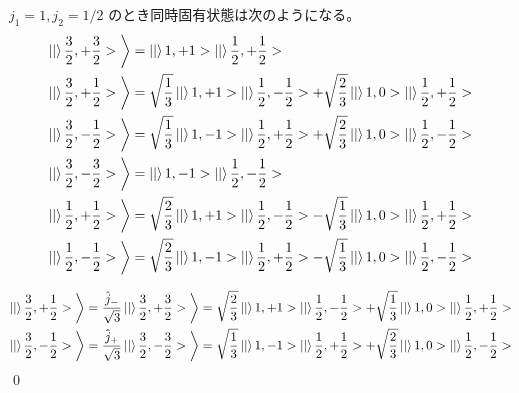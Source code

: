 \documentclass[uplatex,dvipdfmx,a4paper,11pt]{jlreq}
\makeatletter
\numberwithin{equation}{section}
\theoremstyle{definition}
\renewenvironment{proof}[1][\proofname]{\par
  \normalfont
  \topsep6\p@\@plus6\p@ \trivlist
  \item[\hskip\labelsep{\bfseries #1}\@addpunct{\bfseries}]\ignorespaces\quad\par
}{%
  \qed\endtrivlist\@endpefalse
}
\renewcommand\proofname{証明}
\makeatother
\begin{document}
\begin{proposition}
  $j_1 = 1, j_2 = 1/2$ のとき同時固有状態は次のようになる。
  \begin{align}
    \ket|\frac{3}{2}, +\frac{3}{2}>\bigg\rangle & = \ket|1, +1>\ket|\frac{1}{2}, +\frac{1}{2}>                                                                                 \\
    \ket|\frac{3}{2}, +\frac{1}{2}>\bigg\rangle & = \sqrt{\frac{1}{3}}\ket|1, +1>\ket|\frac{1}{2}, -\frac{1}{2}> + \sqrt{\frac{2}{3}}\ket|1, 0>\ket|\frac{1}{2}, +\frac{1}{2}> \\
    \ket|\frac{3}{2}, -\frac{1}{2}>\bigg\rangle & = \sqrt{\frac{1}{3}}\ket|1, -1>\ket|\frac{1}{2}, +\frac{1}{2}> + \sqrt{\frac{2}{3}}\ket|1, 0>\ket|\frac{1}{2}, -\frac{1}{2}> \\
    \ket|\frac{3}{2}, -\frac{3}{2}>\bigg\rangle & = \ket|1, -1>\ket|\frac{1}{2}, -\frac{1}{2}>                                                                                 \\
    \ket|\frac{1}{2}, +\frac{1}{2}>\bigg\rangle & = \sqrt{\frac{2}{3}}\ket|1, +1>\ket|\frac{1}{2}, -\frac{1}{2}> - \sqrt{\frac{1}{3}}\ket|1, 0>\ket|\frac{1}{2}, +\frac{1}{2}> \\
    \ket|\frac{1}{2}, -\frac{1}{2}>\bigg\rangle & = \sqrt{\frac{2}{3}}\ket|1, -1>\ket|\frac{1}{2}, +\frac{1}{2}> - \sqrt{\frac{1}{3}}\ket|1, 0>\ket|\frac{1}{2}, -\frac{1}{2}>
  \end{align}
\end{proposition}
\begin{proof}
  \begin{align}
    \ket|\frac{3}{2}, +\frac{1}{2}>\bigg\rangle & = \frac{\hat{j}_-}{\sqrt{3}}\ket|\frac{3}{2}, +\frac{3}{2}>\bigg\rangle = \sqrt{\frac{2}{3}}\ket|1, +1>\ket|\frac{1}{2}, -\frac{1}{2}> + \sqrt{\frac{1}{3}}\ket|1, 0>\ket|\frac{1}{2}, +\frac{1}{2}> \\
    \ket|\frac{3}{2}, -\frac{1}{2}>\bigg\rangle & = \frac{\hat{j}_+}{\sqrt{3}}\ket|\frac{3}{2}, -\frac{3}{2}>\bigg\rangle = \sqrt{\frac{1}{3}}\ket|1, -1>\ket|\frac{1}{2}, +\frac{1}{2}> + \sqrt{\frac{2}{3}}\ket|1, 0>\ket|\frac{1}{2}, -\frac{1}{2}>
  \end{align}
\end{proof}
\end{document}
